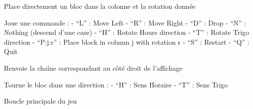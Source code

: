 \documentclass[letterpaper,10pt,french]{sphinxmanual}
\begin{document}
\begin{fulllineitems}
\begin{fulllineitems}
\end{fulllineitems}


\begin{fulllineitems}
\label{\detokenize{index:tetris_engine.TetrisEngine.placeBlockDirect}}
Place directement un bloc dans la colonne et la rotation donnée

\end{fulllineitems}


\begin{fulllineitems}
\label{\detokenize{index:tetris_engine.TetrisEngine.playCommand}}
Joue une commande :
- “L” : Move Left
- “R” : Move Right
- “D” : Drop
- “N” : Nothing (descend d’une case)
- “H” : Rotate Hours direction
- “T” : Rotate Trigo direction
- “P:j:r” : Place block in column j with rotation r
- “S” : Restart
- “Q” : Quit

\end{fulllineitems}


\begin{fulllineitems}
\label{\detokenize{index:tetris_engine.TetrisEngine.printRightColumn}}
Renvoie la chaîne correspondant au côté droit de l’affichage

\end{fulllineitems}


\begin{fulllineitems}
\label{\detokenize{index:tetris_engine.TetrisEngine.rotateBlockInDirection}}
Tourne le bloc dans une direction :
- “H” : Sens Horaire
- “T” : Sens Trigo

\end{fulllineitems}


\begin{fulllineitems}
\label{\detokenize{index:tetris_engine.TetrisEngine.run}}
Boucle principale du jeu


\end{fulllineitems}
\end{fulllineitems}
\end{document}
